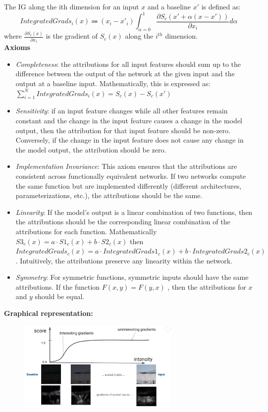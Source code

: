 The IG along the ith dimension for an input $x$ and a baseline $x'$ is defined as:
\begin{equation*}
    IntegratedGrads_i(x) \Coloneqq (x_i-x'_i)\int_{\alpha=0}^1 \frac{\partial S_c(x'+\alpha(x-x'))}{\partial x_i}d\alpha
\end{equation*}
where $\frac{\partial S_c(x)}{\partial x_i}$ is the gradient of $S_c(x)$ along the $i^{th}$ dimension.\\

\textbf{Axioms}\\
\begin{itemize}
    \item \textit{Completeness}: the attributions for all input features should sum up to the difference between the output of the network at the given input and the output at a baseline input. Mathematically, this is expressed as: $\sum_{i=1}^N IntegratedGrads_i(x) = S_c(x)-S_c(x')$
    \item \textit{Sensitivity}: if an input feature changes while all other features remain constant and the change in the input feature causes a change in the model output, then the attribution for that input feature should be non-zero. Conversely, if the change in the input feature does not cause any change in the model output, the attribution should be zero.
    \item \textit{Implementation Invariance}: This axiom ensures that the attributions are consistent across functionally equivalent networks. If two networks compute the same function but are implemented differently (different architectures, parameterizations, etc.), the attributions should be the same.
    \item \textit{Linearity}: If the model's output is a linear combination of two functions, then the attributions should be the corresponding linear combination of the attributions for each function. Mathematically $S3_c(x)=a\cdot S1_c(x)+b\cdot S2_c(x)$ then \\$IntegratedGrads_c(x)=a\cdot IntegratedGrads1_c(x)+b\cdot IntegratedGrads2_c(x)$. Intuitively, the attributions preserve any linearity within the network.
    \item \textit{Symmetry}: For symmetric functions, symmetric inputs should have the same attributions. If the function $F(x, y) = F(y, x)$ , then the attributions for $x$ and $y$ should be equal.
\end{itemize}

\textbf{Graphical representation:}\\
\begin{figure}[H]
    \centering
    \includegraphics[width=0.7\textwidth]{img/IG.png}
\end{figure}

